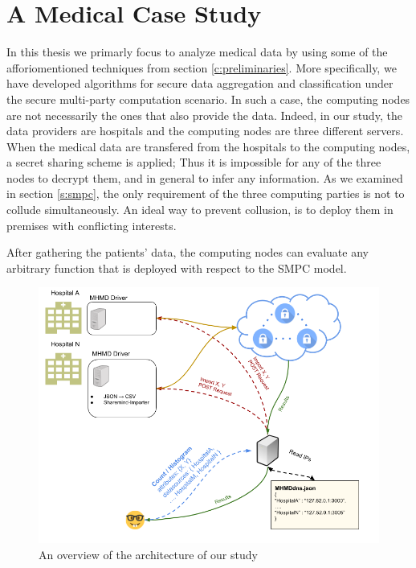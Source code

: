 \chapter{A Medical Case Study}\label{c:medical-study}

In this thesis we primarly focus to analyze medical data by using some of the afforiomentioned techniques from section \ref{c:preliminaries}.
More specifically, we have developed algorithms for secure data aggregation and classification under the secure multi-party computation scenario.
In such a case, the computing nodes are not necessarily the ones that also provide the data.
Indeed, in our study, the data providers are hospitals and the computing nodes are three different servers.
When the medical data are transfered from the hospitals to the computing nodes, a secret sharing scheme is applied; Thus it is impossible for any of the three nodes to decrypt them, and in general to infer any information.
As we examined in section \ref{s:smpc}, the only requirement of the three computing parties is not to collude simultaneously.
An ideal way to prevent collusion, is to deploy them in premises with conflicting interests.


After gathering the patients' data, the computing nodes can evaluate any arbitrary function that is deployed with respect to the SMPC model.



\begin{figure}[H] 
  \centering
  \includegraphics[width=\linewidth]{figures/overview.png}
  \caption{An overview of the architecture of our study}\label{f:overview}
\end{figure} 

